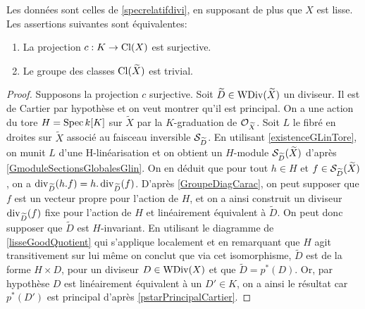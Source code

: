 \begin{thm}\label{clgtrivial}
Les données sont celles de \ref{specrelatifdivi}, en supposant de plus que $X$ est lisse. Les assertions suivantes sont équivalentes:
\begin{enumerate}
\item La projection $c:K\rightarrow \operatorname{Cl}(X)$ est surjective.
\item Le groupe des classes $\operatorname{Cl}(\widetilde{X})$ est trivial.
\end{enumerate}
\end{thm}
\begin{proof}
Supposons la projection $c$ surjective. Soit $\widetilde{D}\in \operatorname{WDiv}(\widetilde{X})$ un diviseur. Il est de Cartier par hypothèse et on veut montrer qu'il est principal. On a une action du tore $H=\operatorname{Spec} k[K]$ sur $\widetilde{X}$ par la $K$-graduation de $\mathcal{O}_{\widetilde{X}}$. Soit $L$ le fibré en droites sur $\widetilde{X}$ associé au faisceau inversible $\mathcal{S}_{\widetilde{D}}$. En utilisant \ref{existenceGLinTore}, on munit $L$ d'une H-linéarisation et on obtient un $H$-module $\mathcal{S}_{\widetilde{D}}(\widetilde{X})$ d'après \ref{GmoduleSectionsGlobalesGlin}. On en déduit que pour tout $h\in H$ et $f\in \mathcal{S}_{\widetilde{D}}(\widetilde{X})$, on a $\operatorname{div}_{\widetilde{D}}(h.f)=h.\operatorname{div}_{\widetilde{D}}(f)$. D'après \ref{GroupeDiagCarac}, on peut supposer que $f$ est un vecteur propre pour l'action de $H$, et on a ainsi construit un diviseur $\operatorname{div}_{\widetilde{D}}(f)$ fixe pour l'action de $H$ et linéairement équivalent à $\widetilde{D}$. On peut donc supposer que $\widetilde{D}$ est $H$-invariant. En utilisant le diagramme de \ref{lisseGoodQuotient} qui s'applique localement et en remarquant que $H$ agit transitivement sur lui même on conclut que via cet isomorphisme, $\widetilde{D}$ est de la forme $H\times D$, pour un diviseur $D\in \operatorname{WDiv}(X)$ et que $\widetilde{D}=p^*(D)$. Or, par hypothèse $D$ est linéairement équivalent à un $D'\in K$, on a ainsi le résultat car $p^*(D')$ est principal d'après \ref{pstarPrincipalCartier}.


\end{proof}
